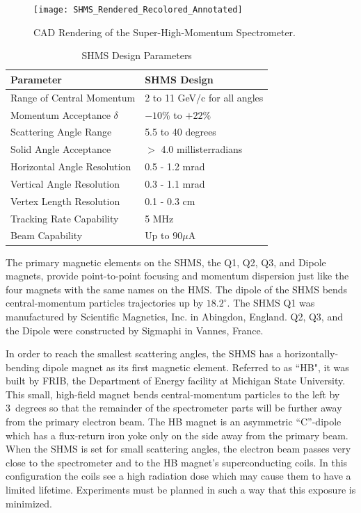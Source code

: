 {\begin{figure}
\texttt{[image: SHMS\_Rendered\_Recolored\_Annotated]}
\caption{CAD Rendering of the Super-High-Momentum Spectrometer. \label{fig:SHMS_CAD_Model}}
\end{figure}

\begin{table}
\begin{center}
\caption{SHMS Design Parameters\label{tab:shms_specs}}
\vspace{\baselineskip}
\begin{tabular}{|l|l|}
\hline
Parameter						& SHMS Design 			\\ \hline
Range of Central Momentum		& 2 to 11 GeV/c for all angles	\\
Momentum Acceptance $\delta$	& $-10\%$ to $+22\%$			\\
Scattering Angle Range			& 5.5 to 40 degrees			\\
Solid Angle Acceptance			& $>$ 4.0 millisterradians		\\
Horizontal Angle Resolution		& 0.5 - 1.2 mrad			\\
Vertical Angle Resolution			& 0.3 - 1.1 mrad			\\
Vertex Length Resolution			& 0.1 - 0.3 cm				\\
Tracking Rate Capability			& 5 MHz					\\
Beam Capability				& Up to $90 \mu$A			\\
\hline
\end{tabular}
\end{center}
\end{table}


The primary magnetic elements on the SHMS, the Q1, Q2, Q3, and Dipole magnets, provide
point-to-point focusing and momentum dispersion just like the four magnets with
the same names on the HMS. The dipole of the SHMS bends central-momentum particles
trajectories up by $18.2^{\circ}$. The SHMS Q1 was
manufactured by Scientific Magnetics, Inc. in Abingdon, England. Q2, Q3, and
the Dipole were constructed by Sigmaphi in Vannes, France.

In order to reach the smallest scattering angles, the SHMS has a horizontally-bending dipole
magnet as its first magnetic element. Referred to as ``HB", it was built by FRIB, the Department of Energy
facility at Michigan State  University. This small, high-field magnet bends
central-momentum particles to the left by 3~degrees so that the remainder of the
spectrometer parts will be further away from the primary electron beam. The HB
magnet is an asymmetric ``C''-dipole which has a flux-return iron yoke only on
the side away from the primary beam. When the SHMS is set for small scattering
angles, the electron beam passes very close to the spectrometer and to the
HB magnet's superconducting
coils. In this configuration the coils see a high radiation dose which may cause
them to have a limited
lifetime. Experiments must be planned in such a way that this exposure is minimized.

}
